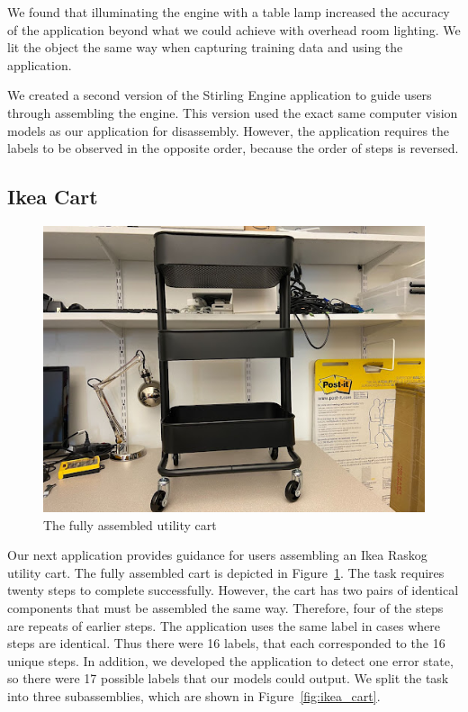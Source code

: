 We found that illuminating the engine with a table lamp increased the accuracy
of the application beyond what we could achieve with overhead room lighting.
We lit the object the same way when capturing training data and using the
application.

We created a second version of the Stirling Engine application to guide users
through assembling the engine.
This version used the exact same computer vision models as our application for
disassembly.
However, the application requires the labels to be observed in the opposite
order, because the order of steps is reversed.

\subsection{Ikea Cart}\label{sec:ikea_cart}

\begin{figure}
  \includegraphics[width=\textwidth]{figures/full_cart.jpg}
  \caption{
    The fully assembled utility cart
  }\label{fig:full_cart}
  \vspace{-0.2in}
\end{figure}

Our next application provides guidance for users assembling an Ikea Raskog
utility cart.
The fully assembled cart is depicted in Figure~\ref{fig:full_cart}.
The task requires twenty steps to complete successfully.
However, the cart has two pairs of identical components that must be
assembled the same way.
Therefore, four of the steps are repeats of earlier steps.
The application uses the same label in cases where steps are identical.
Thus there were 16 labels, that each corresponded to the 16 unique steps.
In addition, we developed the application to detect one error state, so there
were 17 possible labels that our models could output.
We split the task into three subassemblies, which are shown in
Figure~\ref{fig:ikea_cart}.

